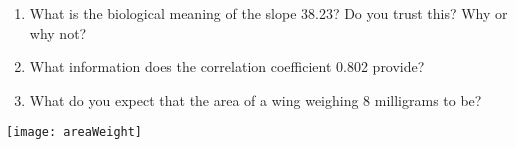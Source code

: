 \documentclass[12pt,fullpage]{amsart}
\begin{document}
\begin{enumerate}
\begin{enumerate}
  \item What is the biological meaning of the slope 38.23?  Do
    you trust this?  Why or why not?

    \item What information does the correlation coefficient 0.802 provide?

  \item What do you expect that the area of a wing weighing 8 milligrams to be?

  \end{enumerate}
\texttt{[image: areaWeight]}

\end{enumerate} 
\end{document}
